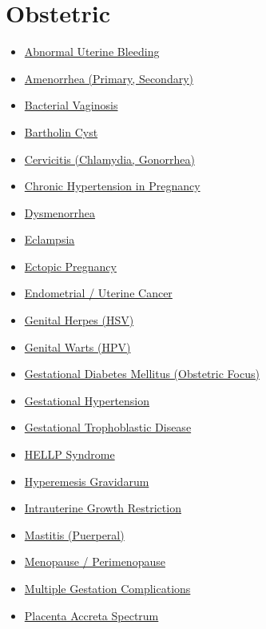 \section*{Obstetric}
\label{sec:organ_obstetric}
\begin{itemize}[noitemsep]
  \item \hyperlink{sec:Abnormal Uterine Bleeding}{Abnormal Uterine Bleeding}
  \item \hyperlink{sec:Amenorrhea}{Amenorrhea (Primary, Secondary)}
  \item \hyperlink{sec:Bacterial Vaginosis}{Bacterial Vaginosis}
  \item \hyperlink{sec:Bartholin Cyst}{Bartholin Cyst}
  \item \hyperlink{sec:Cervicitis}{Cervicitis (Chlamydia, Gonorrhea)}
  \item \hyperlink{sec:Chronic Hypertension in Pregnancy}{Chronic Hypertension in Pregnancy}
  \item \hyperlink{sec:Dysmenorrhea}{Dysmenorrhea}
  \item \hyperlink{sec:Eclampsia}{Eclampsia}
  \item \hyperlink{sec:Ectopic Pregnancy}{Ectopic Pregnancy}
  \item \hyperlink{sec:Endometrial Cancer}{Endometrial / Uterine Cancer}
  \item \hyperlink{sec:Genital Herpes}{Genital Herpes (HSV)}
  \item \hyperlink{sec:Genital Warts}{Genital Warts (HPV)}
  \item \hyperlink{sec:obstetric:Gestational Diabetes Mellitus}{Gestational Diabetes Mellitus (Obstetric Focus)}
  \item \hyperlink{sec:Gestational Hypertension}{Gestational Hypertension}
  \item \hyperlink{sec:Gestational Trophoblastic Disease}{Gestational Trophoblastic Disease}
  \item \hyperlink{sec:HELLP Syndrome}{HELLP Syndrome}
  \item \hyperlink{sec:Hyperemesis Gravidarum}{Hyperemesis Gravidarum}
  \item \hyperlink{sec:Intrauterine Growth Restriction}{Intrauterine Growth Restriction}
  \item \hyperlink{sec:Mastitis}{Mastitis (Puerperal)}
  \item \hyperlink{sec:Menopause}{Menopause / Perimenopause}
  \item \hyperlink{sec:Multiple Gestation Complications}{Multiple Gestation Complications}
  \item \hyperlink{sec:Placenta Accreta Spectrum}{Placenta Accreta Spectrum}

\end{itemize}
